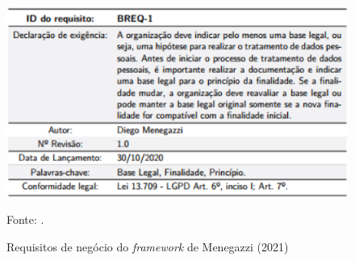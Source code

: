 \documentclass[
	12pt,				%
	openright,			%
	oneside,			%
	a4paper,			%
	english,			%
	french,				%
	spanish,			%
	brazil,				%
	]{abntex2}
\begin{document}
\begin{figure}[ht]
    \centering
    \caption{Requisitos de negócio do \textit{framework} de Menegazzi (2021)}
    \includegraphics[width=6.5in]{Images/10Menegazzi.png}
    \label{fig: MenegazziFigB}
    
    \centering \small Fonte: \cite{Menegazzi2021}.
\end{figure}
\end{document}
